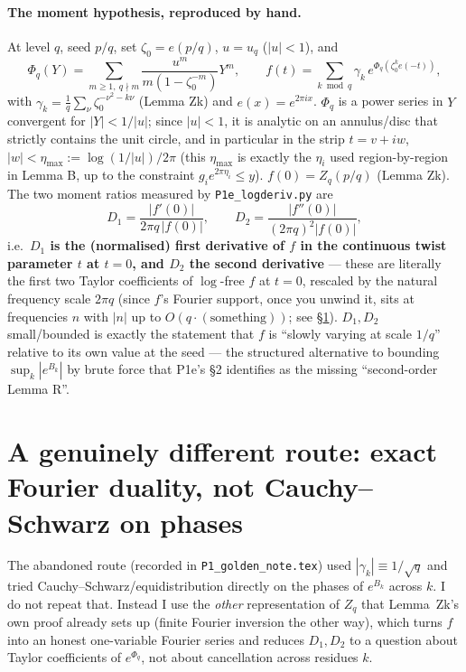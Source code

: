 \documentclass[11pt]{article}
\theoremstyle{remark}\newtheorem{remark}[theorem]{Remark}
\begin{document}
\paragraph{The moment hypothesis, reproduced by hand.} At level $q$, seed $p/q$, set $\zeta_0=e(p/q)$, $u=u_q$ ($|u|<1$), and
\[\Phi_q(Y)=\sum_{m\ge1,\ q\nmid m}\frac{u^m}{m(1-\zeta_0^{-m})}Y^m,\qquad f(t)=\sum_{k\bmod q}\gamma_k\,e^{\Phi_q(\zeta_0^k e(-t))},\]
with $\gamma_k=\frac1q\sum_\nu \zeta_0^{-\nu^2-k\nu}$ (Lemma Zk) and $e(x)=e^{2\pi i x}$. $\Phi_q$ is a power series in $Y$ convergent for $|Y|<1/|u|$; since $|u|<1$, it is analytic on an annulus/disc that strictly contains the unit circle, and in particular in the strip $t=v+iw$, $|w|<\eta_{\max}:=\log(1/|u|)/2\pi$ (this $\eta_{\max}$ is exactly the $\eta_i$ used region-by-region in Lemma B, up to the constraint $g_ie^{2\pi\eta_i}\le y$).
$f(0)=Z_q(p/q)$ (Lemma Zk). The two moment ratios measured by \texttt{P1e\_logderiv.py} are
\[D_1=\frac{|f'(0)|}{2\pi q\,|f(0)|},\qquad D_2=\frac{|f''(0)|}{(2\pi q)^2|f(0)|},\]
i.e.\ \textbf{$D_1$ is the (normalised) first derivative of $f$ in the continuous twist parameter $t$ at $t=0$, and $D_2$ the second derivative} --- these are literally the first two Taylor coefficients of $\log$-free $f$ at $t=0$, rescaled by the natural frequency scale $2\pi q$ (since $f$'s Fourier support, once you unwind it, sits at frequencies $n$ with $|n|$ up to $O(q\cdot(\text{something}))$; see \S\ref{sec:dual}). $D_1,D_2$ small/bounded is exactly the statement that $f$ is ``slowly varying at scale $1/q$'' relative to its own value at the seed --- the structured alternative to bounding $\sup_k|e^{B_k}|$ by brute force that P1e's \S2 identifies as the missing ``second-order Lemma R''.

\section{A genuinely different route: exact Fourier duality, not Cauchy--Schwarz on phases}\label{sec:dual}
The abandoned route (recorded in \texttt{P1\_golden\_note.tex}) used $|\gamma_k|\equiv1/\sqrt q$ and tried Cauchy--Schwarz/equidistribution directly on the phases of $e^{B_k}$ across $k$. I do not repeat that. Instead I use the \emph{other} representation of $Z_q$ that Lemma~Zk's own proof already sets up (finite Fourier inversion the other way), which turns $f$ into an honest one-variable Fourier series and reduces $D_1,D_2$ to a question about Taylor coefficients of $e^{\Phi_q}$, not about cancellation across residues $k$.
\end{document}
